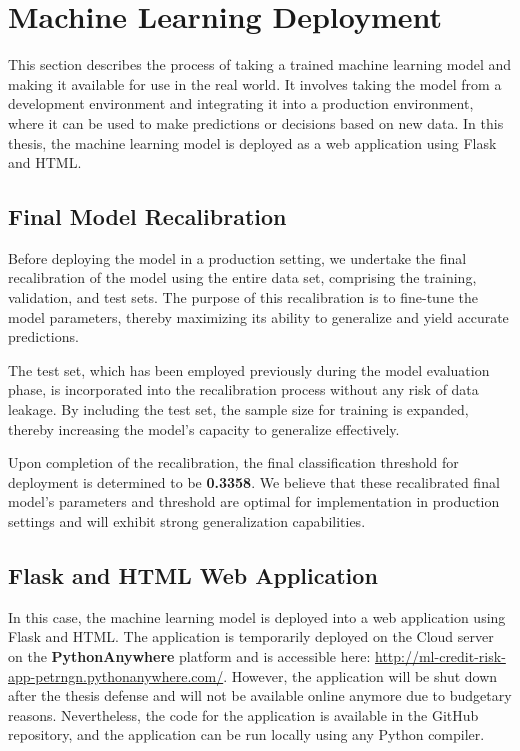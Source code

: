 \newpage
\section{Machine Learning Deployment}
\label{sec:deployment}
This section describes the process of taking a trained machine learning model and making it available for use in the real world. It involves taking the model from a development environment and integrating it into a production environment, where it can be used to make predictions or decisions based on new data. In this thesis, the machine learning model is deployed as a web application using Flask and HTML.

\subsection{Final Model Recalibration}
Before deploying the model in a production setting, we undertake the final recalibration of the model using the entire data set, comprising the training, validation, and test sets.
The purpose of this recalibration is to fine-tune the model parameters, thereby maximizing its ability to generalize and yield accurate predictions.

The test set, which has been employed previously during the model evaluation phase, is incorporated into the recalibration process without any risk of data leakage.
By including the test set, the sample size for training is expanded, thereby increasing the model's capacity to generalize effectively.

Upon completion of the recalibration, the final classification threshold for deployment is determined to be \textbf{0.3358}.
We believe that these recalibrated final model's parameters and threshold are optimal for implementation in production settings and will exhibit strong generalization capabilities.


\subsection{Flask and HTML Web Application}
\label{subsec:flaskapp}

In this case, the machine learning model is deployed into a web application using Flask and HTML. The application is temporarily deployed on the Cloud server on the \textbf{PythonAnywhere} platform and is accessible here: \url{http://ml-credit-risk-app-petrngn.pythonanywhere.com/}.
However, the application will be shut down after the thesis defense and will not be available online anymore due to budgetary reasons.
Nevertheless, the code for the application is available in the GitHub repository, and the application can be run locally using any Python compiler.

